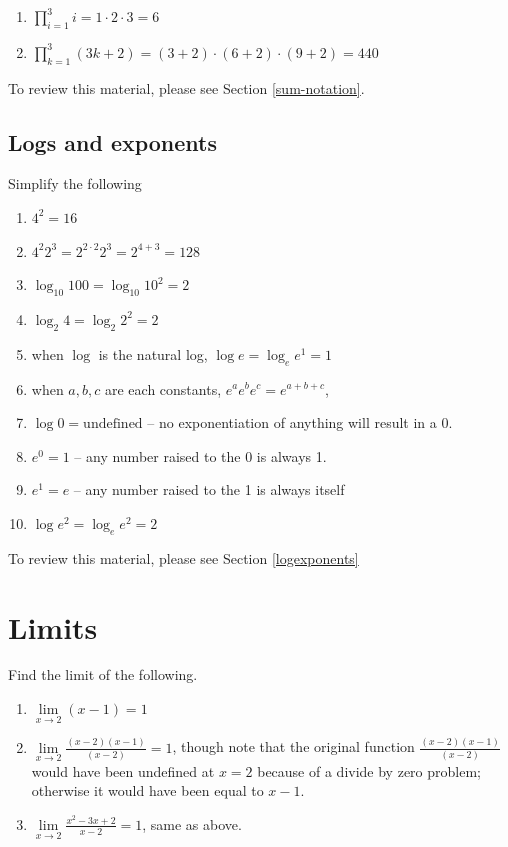 \documentclass[]{book}
\providecommand{\tightlist}{%
  \setlength{\itemsep}{0pt}\setlength{\parskip}{0pt}}
\theoremstyle{definition}
\theoremstyle{definition}
\theoremstyle{definition}
\theoremstyle{remark}
\begin{document}
\begin{enumerate}
\def\labelenumi{\arabic{enumi}.}
\item
  \(\prod\limits_{i= 1}^3 i = 1\cdot 2\cdot 3 = 6\)
\item
  \(\prod\limits_{k=1}^3(3k + 2) = (3 + 2)\cdot (6 + 2)\cdot (9 + 2) = 440\)
\end{enumerate}

To review this material, please see Section \ref{sum-notation}.

\subsection*{Logs and exponents}\label{logs-and-exponents-1}

Simplify the following

\begin{enumerate}
\def\labelenumi{\arabic{enumi}.}
\tightlist
\item
  \(4^2 = 16\)
\item
  \(4^2 2^3 = 2^{2\cdot 2}2^{3} = 2^{4 + 3} = 128\)
\item
  \(\log_{10}100 = \log_{10}10^2 = 2\)
\item
  \(\log_{2}4 = \log_{2}2^2 = 2\)
\item
  when \(\log\) is the natural log, \(\log e = \log_{e} e^1 = 1\)
\item
  when \(a, b, c\) are each constants, \(e^a e^b e^c = e^{a + b + c}\),
\item
  \(\log 0 = \text{undefined}\) -- no exponentiation of anything will
  result in a 0.
\item
  \(e^0 = 1\) -- any number raised to the 0 is always 1.
\item
  \(e^1 = e\) -- any number raised to the 1 is always itself
\item
  \(\log e^2 = \log_e e^2 = 2\)
\end{enumerate}

To review this material, please see Section \ref{logexponents}

\section*{Limits}\label{limits-1}

Find the limit of the following.

\begin{enumerate}
\def\labelenumi{\arabic{enumi}.}
\tightlist
\item
  \(\lim\limits_{x \to 2} (x - 1) = 1\)
\item
  \(\lim\limits_{x \to 2} \frac{(x - 2) (x - 1)}{(x - 2)} = 1\), though
  note that the original function \(\frac{(x - 2) (x - 1)}{(x - 2)}\)
  would have been undefined at \(x = 2\) because of a divide by zero
  problem; otherwise it would have been equal to \(x - 1\).
\item
  \(\lim\limits_{x \to 2}\frac{x^2 - 3x + 2}{x- 2} = 1\), same as above.
\end{enumerate}
\end{document}
